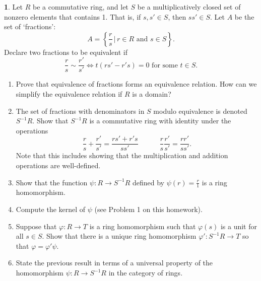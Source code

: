 \documentclass[12pt]{article}
\theoremstyle{definition}
\newtheorem{ex}{}
\begin{document}
\begin{ex}
	Let $R$ be a commutative ring, and let $S$ be a multiplicatively closed set of nonzero elements that contains 1.
	That is, if $s, s' \in S$, then $ss' \in S$.
	Let $A$ be the set of `fractions': \begin{equation*}
		A = \left\lbrace \frac{r}{s} \,|\, r \in R \text{ and } s \in S \right\rbrace.
	\end{equation*}
	Declare two fractions to be equivalent if \begin{equation*}
		\frac{r}{s} \sim \frac{r'}{s'} \iff t(rs' - r's) = 0 \text{ for some $t \in S$}.
	\end{equation*}
	\begin{enumerate}[label=(\alph*)]
		\item Prove that equivalence of fractions forms an equivalence relation. How can we simplify the equivalence relation if $R$ is a domain?
		\item The set of fractions with denominators in $S$ modulo equivalence is denoted $S^{-1}R$.
		      Show that $S^{-1}R$ is a commutative ring with identity under the operations \begin{equation*}
			      \frac{r}{s} + \frac{r'}{s'} = \frac{rs' + r's}{ss'} \hspace{3em} \frac{r}{s}\frac{r'}{s'} = \frac{rr'}{ss'}.
		      \end{equation*}
		      Note that this includes showing that the multiplication and addition operations are well-defined.
		\item Show that the function $\psi : R \to S^{-1}R$ defined by $\psi(r) = \frac{r}{1}$ is a ring homomorphism.
		\item Compute the kernel of $\psi$ (see Problem 1 on this homework).
		\item Suppose that $\varphi : R \to T$ is a ring homomorphism such that $\varphi(s)$ is a unit for all $s \in S$.
		      Show that there is a unique ring homomorphism $\varphi' : S^{-1}R \to T$ so that $\varphi = \varphi'\psi$.
		\item State the previous result in terms of a universal property of the homomorphism $\psi : R \to S^{-1}R$ in the category of rings.
	\end{enumerate}
\end{ex}
\end{document}
